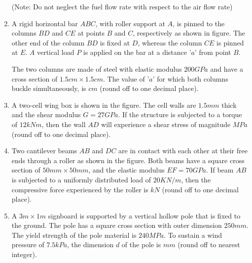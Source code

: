 \documentclass[journal]{IEEEtran}
\begin{document}
\begin{enumerate}
(Note: Do not neglect the fuel flow rate with respect to the air flow rate) 

    \item A rigid horizontal bar $ABC$, with roller support at $A$, is pinned to the columns $BD$ and $CE$ at points $B$ and $C$, respectively as shown in figure. The other end of the column $BD$ is fixed at $D$, whereas the column $CE$ is pinned at $E$. $A$ vertical load $P$ is applied on the bar at a distance '$a$' from point $B$.
        \begin{figure}[!ht]
            \centering
            
        \end{figure}

        The two columns are made of steel with elastic modulus $200 GPa$ and have a cross section of $1.5 cm \times 1.5 cm$. The value of '$a$' for which both columns buckle simultaneously, is \underline{\hspace{1cm}} $cm$ (round off to one decimal place). 

    \item A two-cell wing box is shown in the figure. The cell walls are $1.5 mm$ thick and the shear modulus $G = 27 GPa$. If the structure is subjected to a torque of $12 kNm$, then the wall $AD$ will experience a shear stress of magnitude \underline{\hspace{1cm}} $MPa$ (round off to one decimal place).
        \begin{figure}[!ht]
            \centering
            
        \end{figure} 

    \item Two cantilever beams $AB$ and $DC$ are in contact with each other at their free ends through a roller as shown in the figure. Both beams have a square cross section of $50 mm \times 50 mm$, and the elastic modulus $EF = 70 GPa$. If beam $AB$ is subjected to a uniformly distributed load of $20 KN/m$, then the compressive force experienced by the roller is \underline{\hspace{1cm}} $kN$ (round off to one decimal place).
        \begin{figure}[!ht]
            \centering
            
        \end{figure}

    \item A $3m \times 1m$ signboard is supported by a vertical hollow pole that is fixed to the ground. The pole has a square cross section with outer dimension $250 mm$. The yield strength of the pole material is $240 MPa$. To sustain a wind pressure of $7.5 kPa$, the dimension $d$ of the pole is \underline{\hspace{1cm}} $mm$ (round off to nearest integer).


\end{enumerate}
\end{document}
